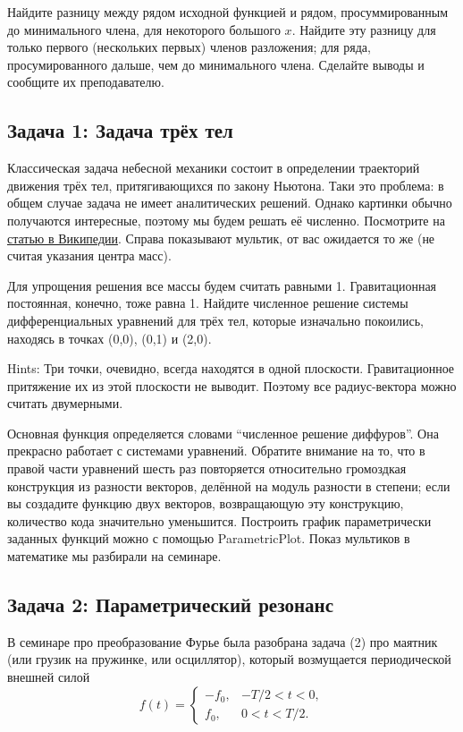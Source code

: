\documentclass[a4paper,12pt]{article}
\theoremstyle{plain} %
\theoremstyle{definition} %
\theoremstyle{remark} %
\begin{document}
Найдите разницу между рядом исходной функцией и рядом, просуммированным до минимального члена, для некоторого большого $x$. Найдите эту разницу для только первого (нескольких первых) членов разложения; для ряда, просумированного дальше, чем до минимального члена. Сделайте выводы и сообщите их преподавателю.

\subsection*{Задача 1: Задача трёх тел}
Классическая задача небесной механики состоит в определении траекторий движения трёх тел, притягивающихся по закону Ньютона. Таки это проблема: в общем случае задача не имеет аналитических решений. Однако картинки обычно получаются интересные, поэтому мы будем решать её численно. Посмотрите на \href{https://ru.wikipedia.org/wiki/%D0%97%D0%B0%D0%B4%D0%B0%D1%87%D0%B0_%D1%82%D1%80%D1%91%D1%85_%D1%82%D0%B5%D0%BB}{статью в Википедии}. Справа показывают мультик, от вас ожидается то же (не считая указания центра масс).

Для упрощения решения все массы будем считать равными 1. Гравитационная постоянная, конечно, тоже равна 1. Найдите численное решение системы дифференциальных уравнений для трёх тел, которые изначально покоились, находясь в точках (0,0), (0,1) и (2,0).

Hints: Три точки, очевидно, всегда находятся в одной плоскости. Гравитационное притяжение их из этой плоскости не выводит. Поэтому все радиус-вектора можно считать двумерными. 

Основная функция определяется словами ``численное решение диффуров''. Она прекрасно работает с системами уравнений. Обратите внимание на то, что в правой части уравнений шесть раз повторяется относительно громоздкая конструкция из разности векторов, делённой на модуль разности в степени; если вы создадите функцию двух векторов, возвращающую эту конструкцию, количество кода значительно уменьшится. Построить график параметрически заданных функций можно с помощью ParametricPlot. Показ мультиков в математике мы разбирали на семинаре.

\subsection*{Задача 2: Параметрический резонанс}

В семинаре про преобразование Фурье была разобрана задача (2) про маятник (или грузик на пружинке, или осциллятор), который возмущается периодической внешней силой 
\begin{equation}
	f(t) = \begin{cases}
		-f_0,& -T/2<t<0, \\
		f_0,&  0<t<T/2.
	\end{cases}
\end{equation}
\end{document}
